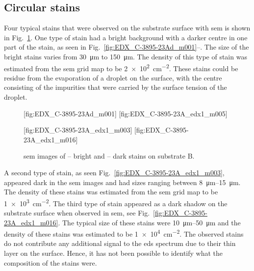 \subsection{Circular stains}
Four typical stains that were observed on the substrate surface with \ac{sem} is shown in Fig.~\ref{fig:subB_stains}. One type of stain had a bright background with a darker centre in one part of the stain, as seen in Fig.~\ref{fig:EDX_C-3895-23Ad_m001}--. The size of the bright stains varies from \SI{30}{\micro\metre} to \SI{150}{\micro\metre}. The density of this type of stain was estimated from the \ac{sem} grid map to be \SI{2e2}{\centi\metre^{-2}}. These stains could be residue from the evaporation of a droplet on the surface, with the centre consisting of the impurities that were carried by the surface tension of the droplet. %

\begin{figure}[htbp]
    \centering
    [fig:EDX_C-3895-23Ad_m001]
    [fig:EDX_C-3895-23A_edx1_m005]
    \par\bigskip
    [fig:EDX_C-3895-23A_edx1_m003]
    [fig:EDX_C-3895-23A_edx1_m016]
    \caption[\Ac{sem} images of stains on substrate B.]{\Ac{sem} images of -- bright and -- dark stains on substrate B.}
    \label{fig:subB_stains}
\end{figure}

A second type of stain, as seen Fig.~\ref{fig:EDX_C-3895-23A_edx1_m003}, appeared dark in the \ac{sem} images and had sizes ranging between \SIrange{8}{15}{\micro\metre}. The density of these stains was estimated from the \ac{sem} grid map to be \SI{1e3}{\centi\metre^{-2}}. The third type of stain appeared as a dark shadow on the substrate surface when observed in \ac{sem}, see Fig.~\ref{fig:EDX_C-3895-23A_edx1_m016}. The typical size of these stains were \SIrange{10}{50}{\micro\metre} and the density of these stains was estimated to be \SI{1e4}{\centi\metre^{-2}}. The observed stains do not contribute any additional signal to the \ac{eds} spectrum due to their thin layer on the surface. Hence, it has not been possible to identify what the composition of the stains were. 

